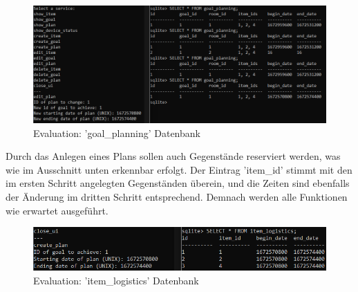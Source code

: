 \begin{figure}[h]
\centering
\includegraphics[width=(\textwidth)]{Bilder/Eval3.png}
\caption{Evaluation: 'goal\_planning' Datenbank}
\end{figure}

Durch das Anlegen eines Plans sollen auch Gegenstände reserviert werden, was wie im Ausschnitt unten erkennbar erfolgt. Der Eintrag 'item\_id' stimmt mit den im ersten Schritt angelegten Gegenständen überein, und die Zeiten sind ebenfalls der Änderung im dritten Schritt entsprechend. Demnach werden alle Funktionen wie erwartet ausgeführt.

\begin{figure}[h]
\centering
\includegraphics[width=(\textwidth)]{Bilder/Eval4.png}
\caption{Evaluation: 'item\_logistics' Datenbank}
\end{figure}
